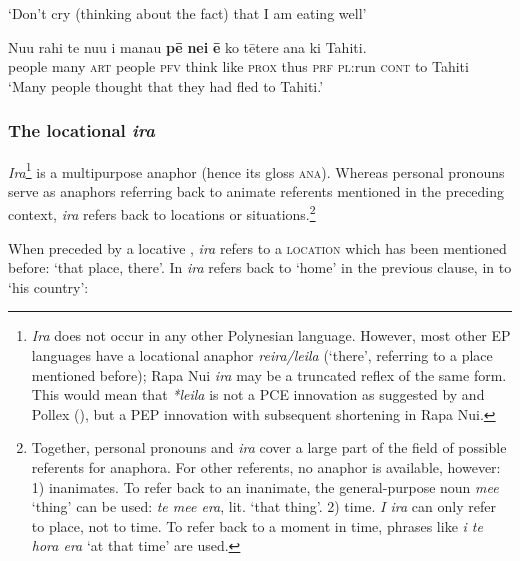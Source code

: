 \glt 
‘Don’t cry (thinking about the fact) that I am eating well’ \textstyleExampleref{[R304.033]} 
\z

\ea\label{ex:4.232}
\gll Nu{\ꞌ}u rahi te nu{\ꞌ}u i mana{\ꞌ}u \textbf{pē} \textbf{nei} \textbf{ē} ko tētere {\ꞌ}ana ki Tahiti. \\
people many \textsc{art} people \textsc{pfv} think like \textsc{prox} thus \textsc{prf} \textsc{pl}:run \textsc{cont} to Tahiti \\

\glt 
‘Many people thought that they had fled to Tahiti.’ \textstyleExampleref{[R303.051]} 
\z

\subsubsection{The  locational \textit{ira}}\label{sec:4.6.5.2}
\textit{Ira}\footnote{\label{fn:225}\textit{Ira} does not occur in any other Polynesian language. However, most other EP languages have a locational anaphor \textit{reira/leila} (‘there’, referring to a place mentioned before); Rapa Nui \textit{ira} may be a truncated reflex of the same form. This would mean that \textit{*leila} is not a PCE innovation as suggested by \citet[12]{Green1985} and Pollex (\citealt{GreenhillClark2011}), but a PEP innovation with subsequent shortening in Rapa Nui.} is a multipurpose anaphor (hence its gloss \textsc{ana}). Whereas personal pronouns serve as anaphors referring back to animate referents mentioned in the preceding context, \textit{ira} refers back to locations or situations.\footnote{\label{fn:226}Together, personal pronouns and \textit{ira} cover a large part of the field of possible referents for anaphora. For other referents, no anaphor is available, however: 1) inanimates. To refer back to an inanimate, the general-purpose noun \textit{me{\ꞌ}e} ‘thing’ can be used: \textit{te me{\ꞌ}e era}, lit. ‘that thing’. 2) time. \textit{{\ꞌ}I ira} can only refer to place, not to time. To refer back to a moment in time, phrases like \textit{{\ꞌ}i te hora era} ‘at that time’ are used.}

When preceded by a locative , \textit{ira} refers to a \textsc{location} which has been mentioned before: ‘that place, there’. In  \textit{ira} refers back to ‘home’ in the previous clause, in  to ‘his country’:

